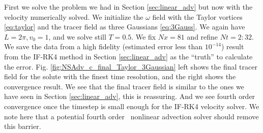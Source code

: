 \documentclass[11pt,letterpaper]{article}
\begin{document}
First we solve the problem we had in Section \ref{sec:linear_adv} but now with the velocity numerically solved. We initialize the $\omega$ field with the Taylor vortices \eqref{eq:taylor} and the tracer field as three Gaussians \eqref{eq:3Gauss}. We again have $L = 2\pi, v_0 = 1$, and we solve still $T = 0.5$. We fix $Nx = 81$ and refine $Nt = 2:32$. We save the data from a high fidelity (estimated error less than $10^{-14}$) result from the IF-RK4 method in Section \ref{sec:linear_adv} as the ``truth'' to calculate the error. Fig. \ref{fig:NSAdv_c_final_Taylor_3Gaussian} left shows the final tracer field for the solute with the finest time resolution, and the right shows the convergence result. We see that the final tracer field is similar to the ones we have seen in Section \ref{sec:linear_adv}, this is reassuring. And we see fourth order convergence once the timestep is small enough for the IF-RK4 velocity solver. We note here that a potential fourth order \sml\ nonlinear advection solver should remove this barrier. 
\end{document}
